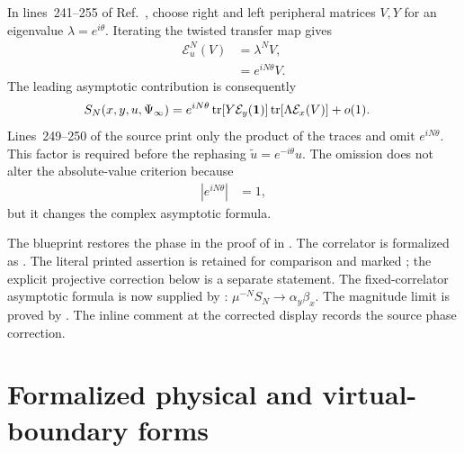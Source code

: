 \documentclass[11pt]{article}
\begin{document}
In lines~241--255 of Ref.~\cite{PerezGarcia2008StringOrder}, choose right and
left peripheral matrices $V,Y$ for an eigenvalue
$\lambda=e^{i\theta}$. Iterating the twisted transfer map gives
\begin{align}
    \mathcal{E}_u^N(V)
     & =\lambda^N V,
    \label{eq:pgwsvc08_string_order_virtual_boundary_peripheral_iteration} \\
     & =e^{iN\theta}V.
    \label{eq:pgwsvc08_string_order_virtual_boundary_peripheral_phase}
\end{align}
The leading asymptotic contribution is consequently
\begin{align}
    S_N(x,y,u,\Psi_\infty)
     & =
    e^{iN\theta}
    \operatorname{tr}\!\left[Y\mathcal{E}_y(\mathbf{1})\right]
    \operatorname{tr}\!\left[\Lambda\mathcal{E}_x(V)\right]
    +o(1).
    \label{eq:pgwsvc08_string_order_virtual_boundary_corrected_asymptotic}
\end{align}
Lines~249--250 of the source print only the product of the traces and omit
$e^{iN\theta}$. This factor is required before the rephasing
$\widetilde{u}=e^{-i\theta}u$. The omission does not alter the absolute-value
criterion because
\begin{align}
    \left|e^{iN\theta}\right|
     & =1,
    \label{eq:pgwsvc08_string_order_virtual_boundary_phase_modulus}
\end{align}
but it changes the complex asymptotic formula.

The blueprint restores the phase in the proof of
 in
. The correlator is
formalized as . The literal
printed assertion is retained for comparison and marked ;
the explicit projective correction below is a separate statement.
The fixed-correlator asymptotic formula is now supplied by
:
$\mu^{-N}S_N\to\alpha_y\beta_x$. The magnitude limit is proved by
.
The inline  comment at the corrected display records the
source phase correction.

\section{Formalized physical and virtual-boundary forms}
\end{document}
